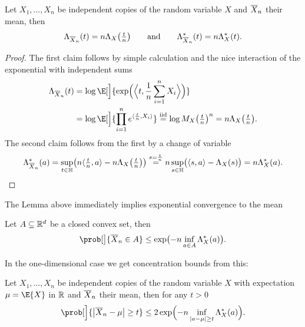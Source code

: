 \begin{lemma}
    Let \(X_1, \ldots, X_n\) be independent copies of the random variable \(X\)
    and \(\overline{X}_n\) their mean, then
    \begin{equation}
        \label{eq: cumulant generating function of the mean}
        \Lambda_{\overline{X}_n}(t) = n \Lambda_X\bigl(\tfrac{t}n\bigr)
        \qquad\text{and}\qquad
        \Lambda_{\overline{X}_n}^*(t) = n \Lambda_X^*(t).
    \end{equation}
\end{lemma}
\begin{proof}
    The first claim follows by simple calculation and the nice interaction of
    the exponential with independent sums
    \[\begin{aligned}
        \CGF_{\mean{X}_n}(t)
        &= \log \E[\Big]{\exp\Bigl(\scp[\Big]{t, \frac1n \sum_{i=1}^n X_i}\Bigr)}
        \\
        &= \log \E[\Big]{\prod_{i=1}^n e^{\scp{\frac{t}n, X_i}}}
        \overset{\iid}= \log \MGF_X\bigl(\tfrac{t}n\bigr)^n
        = n \CGF_X\bigl(\tfrac{t}n\bigr).
    \end{aligned}
    \]
    The second claim follows from the first by a change of variable
    \[
        \Lambda_{\overline{X}_n}^*(a)
        = \sup_{t\in \mathbb{H}} \bigl(n \langle\tfrac{t}n, a\rangle - n \Lambda_X\bigl(\tfrac{t}n\bigr)\bigr)
        \overset{s=\frac{t}n}= n \sup_{s\in \mathbb{H}} \bigl(\langle s, a\rangle - \Lambda_X(s)\bigr)
        = n \Lambda_X^*(a).
        \qedhere
    \]
\end{proof}

The Lemma above immediately implies exponential convergence to the mean
\begin{mdframed}[innertopmargin=0pt]
\begin{corollary}
    Let \(A\subseteq \mathbb{R}^d\) be a closed convex set, then
    \[
        \prob[\big]{\mean{X}_n \in A} \le \exp\bigl(-n \inf_{a\in A} \CGF_X^*(a)\bigr).
    \]
\end{corollary}
\end{mdframed}
In the one-dimensional case we get concentration bounds from this:
\begin{mdframed}[innertopmargin=0pt]
\begin{theorem}
    Let \(X_1, \ldots, X_n\) be independent copies of the random variable \(X\)
    with expectation \(\mu=\E{X}\) in \(\mathbb{R}\) and \(\overline{X}_n\) their mean,
    then for any \(t > 0\)
    \[
        \prob[\Big]{\abs[\big]{\mean{X}_n - \mu} \ge t} \le 2 \exp\Bigl(-n \inf_{\abs{a-\mu}\ge t} \CGF_X^*(a)\Bigr).
    \]
\end{theorem}
\end{mdframed}

